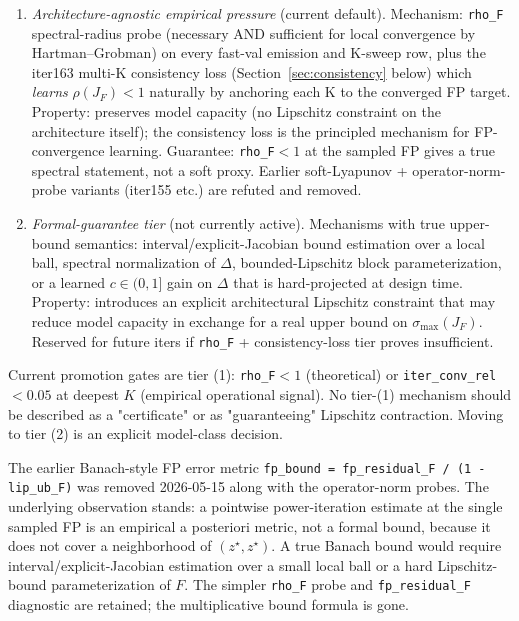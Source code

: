 \documentclass[11pt]{article}
\begin{document}
\begin{enumerate}[leftmargin=2em,itemsep=0.2em]
  \item \emph{Architecture-agnostic empirical pressure} (current default).
    Mechanism: \texttt{rho\_F} spectral-radius probe (necessary AND
    sufficient for local convergence by Hartman--Grobman) on every
    fast-val emission and K-sweep row, plus the iter163 multi-K
    consistency loss (Section~\ref{sec:consistency} below) which
    \emph{learns} $\rho(J_F)<1$ naturally by anchoring each K to the
    converged FP target.  Property: preserves model capacity (no
    Lipschitz constraint on the architecture itself); the consistency
    loss is the principled mechanism for FP-convergence learning.
    Guarantee: \texttt{rho\_F}$<1$ at the sampled FP gives a true
    spectral statement, not a soft proxy.  Earlier soft-Lyapunov +
    operator-norm-probe variants (iter155 etc.) are refuted and removed.
  \item \emph{Formal-guarantee tier} (not currently active).  Mechanisms
    with true upper-bound semantics: interval/explicit-Jacobian bound
    estimation over a local ball, spectral normalization of $\Delta$,
    bounded-Lipschitz block parameterization, or a learned $c\in(0,1]$
    gain on $\Delta$ that is hard-projected at design time.  Property:
    introduces an explicit architectural Lipschitz constraint that may
    reduce model capacity in exchange for a real upper bound on
    $\sigma_{\max}(J_F)$.  Reserved for future iters if \texttt{rho\_F}
    + consistency-loss tier proves insufficient.
\end{enumerate}

Current promotion gates are tier (1): \texttt{rho\_F}$<1$ (theoretical)
or \texttt{iter\_conv\_rel}$<0.05$ at deepest $K$ (empirical operational
signal).  No tier-(1) mechanism should be described as a "certificate"
or as "guaranteeing" Lipschitz contraction.  Moving to tier (2) is an
explicit model-class decision.

The earlier Banach-style FP error metric \texttt{fp\_bound = fp\_residual\_F / (1 - lip\_ub\_F)}
was removed 2026-05-15 along with the operator-norm probes.  The
underlying observation stands: a pointwise power-iteration estimate at
the single sampled FP is an empirical a posteriori metric, not a formal
bound, because it does not cover a neighborhood of $(z^\star,z^\star)$.
A true Banach bound would require interval/explicit-Jacobian estimation
over a small local ball or a hard Lipschitz-bound parameterization of
$F$.  The simpler \texttt{rho\_F} probe and \texttt{fp\_residual\_F}
diagnostic are retained; the multiplicative bound formula is gone.
\end{document}
